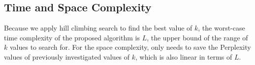 \subsection{Time and Space Complexity}
Because we apply hill climbing search to find the best value of $k$, the worst-case time complexity of the proposed algorithm is $L$, the upper bound of the range of $k$ values to search for. For the space complexity, \name only needs to save the Perplexity values of previously investigated values of $k$, which is also linear in terms of $L$.


